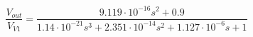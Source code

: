 \begin{equation}
\frac{V_{out}}{V_{V1}} = \frac{9.119 \cdot 10^{-16} s^{2} + 0.9}{1.14 \cdot 10^{-21} s^{3} + 2.351 \cdot 10^{-14} s^{2} + 1.127 \cdot 10^{-6} s + 1}
\end{equation}

